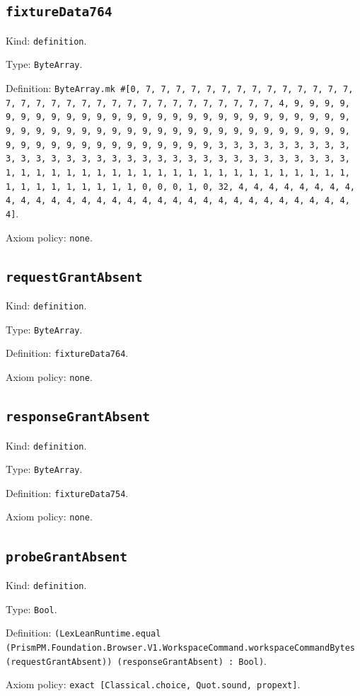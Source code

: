 \documentclass[11pt]{article}
\begin{document}
\subsection*{\texttt{fixtureData764}}
\noindent Kind: \texttt{definition}.\par
\noindent Type: \texttt{ByteArray}.\par
\noindent Definition: \texttt{ByteArray.mk \#[0, 7, 7, 7, 7, 7, 7, 7, 7, 7, 7, 7, 7, 7, 7, 7, 7, 7, 7, 7, 7, 7, 7, 7, 7, 7, 7, 7, 7, 7, 7, 7, 7, 4, 9, 9, 9, 9, 9, 9, 9, 9, 9, 9, 9, 9, 9, 9, 9, 9, 9, 9, 9, 9, 9, 9, 9, 9, 9, 9, 9, 9, 9, 9, 9, 9, 9, 9, 9, 9, 9, 9, 9, 9, 9, 9, 9, 9, 9, 9, 9, 9, 9, 9, 9, 9, 9, 9, 9, 9, 9, 9, 9, 9, 9, 9, 9, 9, 3, 3, 3, 3, 3, 3, 3, 3, 3, 3, 3, 3, 3, 3, 3, 3, 3, 3, 3, 3, 3, 3, 3, 3, 3, 3, 3, 3, 3, 3, 3, 3, 1, 1, 1, 1, 1, 1, 1, 1, 1, 1, 1, 1, 1, 1, 1, 1, 1, 1, 1, 1, 1, 1, 1, 1, 1, 1, 1, 1, 1, 1, 1, 1, 0, 0, 0, 1, 0, 32, 4, 4, 4, 4, 4, 4, 4, 4, 4, 4, 4, 4, 4, 4, 4, 4, 4, 4, 4, 4, 4, 4, 4, 4, 4, 4, 4, 4, 4, 4, 4, 4]}.\par
\noindent Axiom policy: \texttt{none}.\par
\subsection*{\texttt{requestGrantAbsent}}
\noindent Kind: \texttt{definition}.\par
\noindent Type: \texttt{ByteArray}.\par
\noindent Definition: \texttt{fixtureData764}.\par
\noindent Axiom policy: \texttt{none}.\par
\subsection*{\texttt{responseGrantAbsent}}
\noindent Kind: \texttt{definition}.\par
\noindent Type: \texttt{ByteArray}.\par
\noindent Definition: \texttt{fixtureData754}.\par
\noindent Axiom policy: \texttt{none}.\par
\subsection*{\texttt{probeGrantAbsent}}
\noindent Kind: \texttt{definition}.\par
\noindent Type: \texttt{Bool}.\par
\noindent Definition: \texttt{(LexLeanRuntime.equal (PrismPM.Foundation.Browser.V1.WorkspaceCommand.workspaceCommandBytes (requestGrantAbsent)) (responseGrantAbsent) : Bool)}.\par
\noindent Axiom policy: \texttt{exact [Classical.choice, Quot.sound, propext]}.\par
\end{document}
